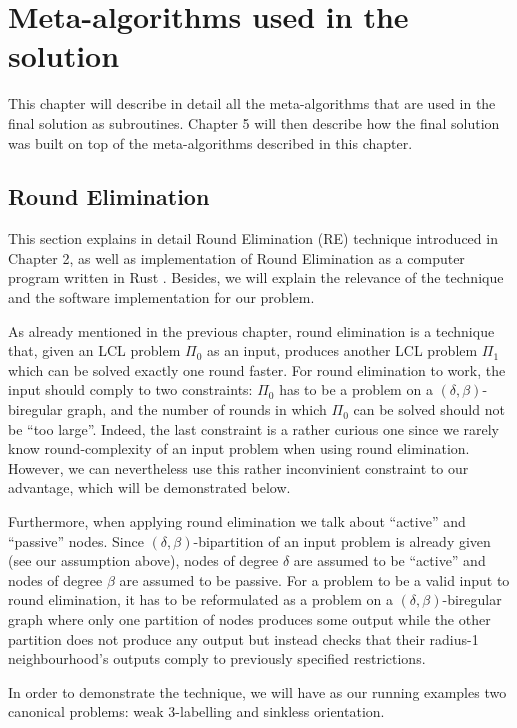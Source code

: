 \chapter{Meta-algorithms used in the solution}
\label{chapter:environment}

This chapter will describe in detail all the meta-algorithms that are
used in the final solution as subroutines.
Chapter 5 will then
describe how the final solution was built on top of the meta-algorithms
described in this chapter.

\section{Round Elimination}

This section explains in detail Round Elimination (RE)
technique introduced in Chapter 2, as well as
implementation of Round Elimination as a computer
program written in Rust \cite{Brandt2019, Olivetti2020}.
Besides, we will explain the relevance of the technique
and the software implementation for our problem.

As already mentioned in the previous chapter, round elimination
is a technique that, given an LCL problem $\Pi_0$ as an input, produces
another LCL problem $\Pi_1$ which can be solved exactly one round
faster. For round elimination to work, the input should comply
to two constraints: $\Pi_0$ has to be a problem on a $(\delta, \beta)$-
biregular graph, and the number of rounds in which $\Pi_0$ can be solved
should not be ``too large''. Indeed, the last constraint is a rather curious one
since we rarely know round-complexity of an input problem when using
round elimination. However, we can nevertheless use this rather inconvinient constraint
to our advantage, which will be demonstrated below.

Furthermore, when applying round elimination we talk about ``active'' and
``passive'' nodes. Since $(\delta, \beta)$-bipartition of an input problem is
already given (see our assumption above), nodes of degree $\delta$ are assumed
to be ``active'' and nodes of degree $\beta$ are assumed to be passive. For a problem
to be a valid input to round elimination, it has to be reformulated as a problem on
a $(\delta, \beta)$-biregular graph where only one partition of nodes produces
some output while the other partition does not produce any output but instead
checks that their radius-1 neighbourhood's outputs comply to previously
specified restrictions.

In order to demonstrate the technique, we will have as our running
examples two canonical problems: weak 3-labelling and sinkless orientation.

